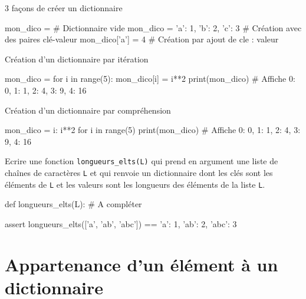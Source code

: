 \begin{easybox}{3 façons de créer un dictionnaire}{}
	\begin{CodePythontexAlt}[TaillePolice=\normalsize, Largeur=1\linewidth,Centre,PremLigne=1]{}
mon_dico = {}					   # Dictionnaire vide
mon_dico = {'a': 1, 'b': 2, 'c': 3} # Création avec des paires clé-valeur
mon_dico['a'] = 4				   # Création par ajout de cle : valeur
\end{CodePythontexAlt}
\end{easybox}

\begin{easybox}{Création d'un dictionnaire par itération}{}
	\begin{CodePythontexAlt}[TaillePolice=\normalsize, Largeur=1\linewidth,Centre,PremLigne=1]{}
mon_dico = {}
for i in range(5):
	mon_dico[i] = i**2
print(mon_dico) # Affiche {0: 0, 1: 1, 2: 4, 3: 9, 4: 16}
\end{CodePythontexAlt}
\end{easybox}

\begin{easybox}{Création d'un dictionnaire par compréhension}{}
	\begin{CodePythontexAlt}[TaillePolice=\normalsize, Largeur=1\linewidth,Centre,PremLigne=1]{}
mon_dico = {i: i**2 for i in range(5)}
print(mon_dico) # Affiche {0: 0, 1: 1, 2: 4, 3: 9, 4: 16}
\end{CodePythontexAlt}
\end{easybox}

\begin{exercice_cours}{}
 Ecrire une fonction \texttt{longueurs\_elts(L)} qui prend en argument une liste de chaînes de caractères \texttt{L} et qui renvoie un dictionnaire dont les clés sont les éléments de \texttt{L} et les valeurs sont les longueurs des éléments de la liste \texttt{L}.
 
 
 \begin{CodePythontexAlt}[TaillePolice=\normalsize, Largeur=1\linewidth,Centre,PremLigne=1, Lignes=false,]{}
def longueurs_elts(L):
	# A compléter
	

	






assert longueurs_elts(['a', 'ab', 'abc']) == {'a': 1, 'ab': 2, 'abc': 3}
\end{CodePythontexAlt}
\end{exercice_cours}


\section{Appartenance d'un élément à un dictionnaire}

